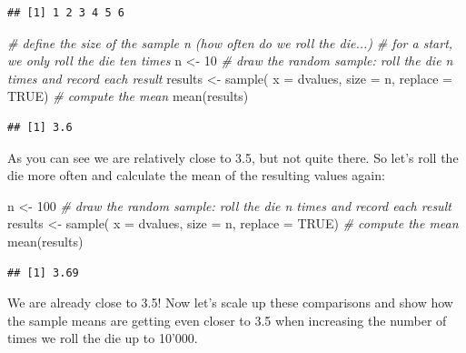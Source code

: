 \documentclass[
  12pt,
]{style/krantz}
\newenvironment{Shaded}{\begin{snugshade}}{\end{snugshade}}
\newcommand{\AttributeTok}[1]{\textcolor[rgb]{0.77,0.63,0.00}{#1}}
\newcommand{\CommentTok}[1]{\textcolor[rgb]{0.56,0.35,0.01}{\textit{#1}}}
\newcommand{\ConstantTok}[1]{\textcolor[rgb]{0.00,0.00,0.00}{#1}}
\newcommand{\DecValTok}[1]{\textcolor[rgb]{0.00,0.00,0.81}{#1}}
\newcommand{\FunctionTok}[1]{\textcolor[rgb]{0.00,0.00,0.00}{#1}}
\newcommand{\NormalTok}[1]{#1}
\newcommand{\OtherTok}[1]{\textcolor[rgb]{0.56,0.35,0.01}{#1}}
\begin{document}
\begin{verbatim}
## [1] 1 2 3 4 5 6
\end{verbatim}

\begin{Shaded}
\begin{Highlighting}[]
\CommentTok{\# define the size of the sample n (how often do we roll the die...)}
\CommentTok{\# for a start, we only roll the die ten times}
\NormalTok{n }\OtherTok{\textless{}{-}} \DecValTok{10}
\CommentTok{\# draw the random sample: \textquotesingle{}roll the die n times and record each result\textquotesingle{}}
\NormalTok{results }\OtherTok{\textless{}{-}} \FunctionTok{sample}\NormalTok{( }\AttributeTok{x =}\NormalTok{ dvalues, }\AttributeTok{size =}\NormalTok{ n, }\AttributeTok{replace =} \ConstantTok{TRUE}\NormalTok{)}
\CommentTok{\# compute the mean}
\FunctionTok{mean}\NormalTok{(results)}
\end{Highlighting}
\end{Shaded}

\begin{verbatim}
## [1] 3.6
\end{verbatim}

As you can see we are relatively close to 3.5, but not quite there. So let's roll the die more often and calculate the mean of the resulting values again:

\begin{Shaded}
\begin{Highlighting}[]
\NormalTok{n }\OtherTok{\textless{}{-}} \DecValTok{100}
\CommentTok{\# draw the random sample: \textquotesingle{}roll the die n times and record each result\textquotesingle{}}
\NormalTok{results }\OtherTok{\textless{}{-}} \FunctionTok{sample}\NormalTok{( }\AttributeTok{x =}\NormalTok{ dvalues, }\AttributeTok{size =}\NormalTok{ n, }\AttributeTok{replace =} \ConstantTok{TRUE}\NormalTok{)}
\CommentTok{\# compute the mean}
\FunctionTok{mean}\NormalTok{(results)}
\end{Highlighting}
\end{Shaded}

\begin{verbatim}
## [1] 3.69
\end{verbatim}

We are already close to 3.5! Now let's scale up these comparisons and show how the sample means are getting even closer to 3.5 when increasing the number of times we roll the die up to 10'000.
\end{document}
